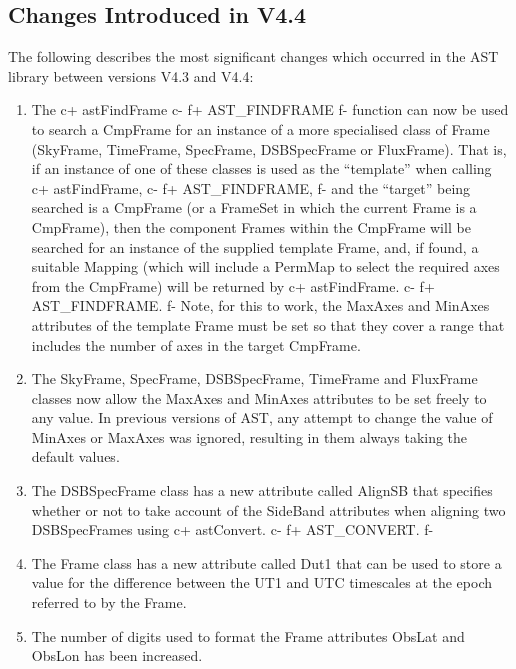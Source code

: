 \documentclass[twoside,11pt]{article}
\begin{document}
\subsection{Changes Introduced in V4.4}

The following describes the most significant changes which occurred in
the AST library between versions V4.3 and V4.4:

\begin{enumerate}

\item The 
c+
astFindFrame 
c-
f+
AST\_FINDFRAME
f-
function can now be used to search a CmpFrame for an instance of a more
specialised class of Frame (SkyFrame, TimeFrame, SpecFrame, DSBSpecFrame
or FluxFrame). That is, if an instance of one of these classes is used as
the ``template'' when calling 
c+
astFindFrame,
c-
f+
AST\_FINDFRAME,
f-
and the ``target'' being searched is a CmpFrame (or a FrameSet in which the 
current Frame is a CmpFrame), then the component Frames within the CmpFrame 
will be searched for an instance of the supplied template Frame, and, if 
found, a suitable Mapping (which will include a PermMap to select the 
required axes from the CmpFrame) will be returned by 
c+
astFindFrame.
c-
f+
AST\_FINDFRAME.
f-
Note, for this to work, the MaxAxes and MinAxes attributes of the template 
Frame must be set so that they cover a range that includes the number of axes 
in the target CmpFrame.

\item The SkyFrame, SpecFrame, DSBSpecFrame, TimeFrame and FluxFrame classes 
now allow the MaxAxes and MinAxes attributes to be set freely to any value.
In previous versions of AST, any attempt to change the value of MinAxes
or MaxAxes was ignored, resulting in them always taking the default values.

\item The DSBSpecFrame class has a new attribute called AlignSB that
specifies whether or not to take account of the SideBand attributes when
aligning two DSBSpecFrames using 
c+
astConvert.
c-
f+
AST\_CONVERT.
f-

\item The Frame class has a new attribute called Dut1 that can be used to
store a value for the difference between the UT1 and UTC timescales at 
the epoch referred to by the Frame. 

\item The number of digits used to format the Frame attributes ObsLat and 
ObsLon has been increased.


\end{enumerate}
\end{document}
